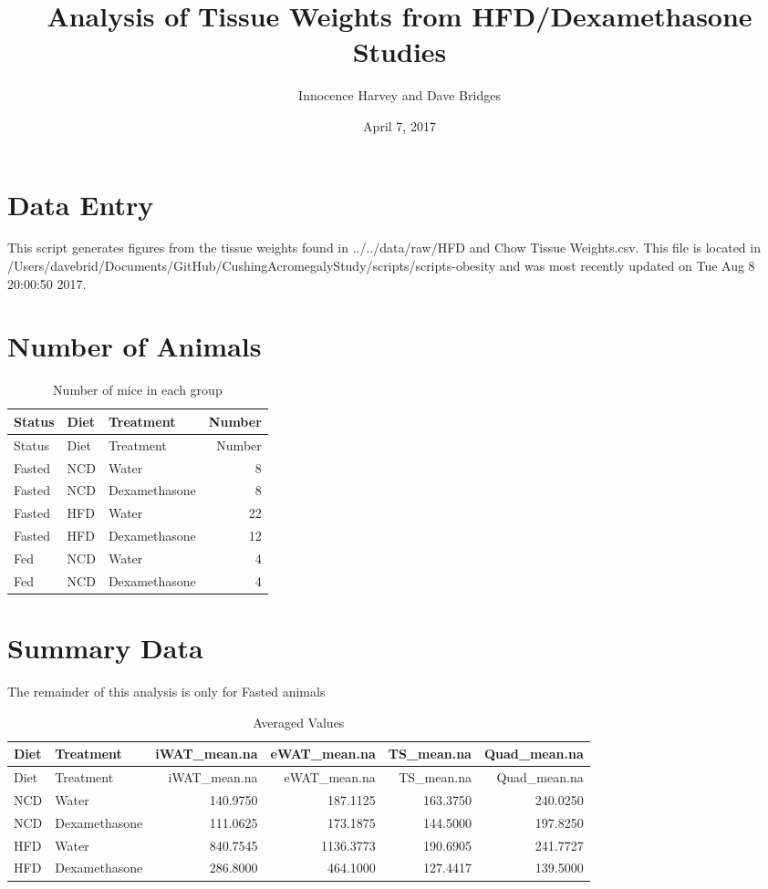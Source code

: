 \documentclass[]{article}
\title{Analysis of Tissue Weights from HFD/Dexamethasone Studies}
\author{Innocence Harvey and Dave Bridges}
\date{April 7, 2017}
\begin{document}
\maketitle

{
\setcounter{tocdepth}{2}
\tableofcontents
}
\section{Data Entry}\label{data-entry}

This script generates figures from the tissue weights found in
../../data/raw/HFD and Chow Tissue Weights.csv. This file is located in
/Users/davebrid/Documents/GitHub/CushingAcromegalyStudy/scripts/scripts-obesity
and was most recently updated on Tue Aug 8 20:00:50 2017.

\section{Number of Animals}\label{number-of-animals}

\begin{longtable}[]{@{}lllr@{}}
\caption{Number of mice in each group}\tabularnewline
\toprule
Status & Diet & Treatment & Number\tabularnewline
\midrule
\endfirsthead
\toprule
Status & Diet & Treatment & Number\tabularnewline
\midrule
\endhead
Fasted & NCD & Water & 8\tabularnewline
Fasted & NCD & Dexamethasone & 8\tabularnewline
Fasted & HFD & Water & 22\tabularnewline
Fasted & HFD & Dexamethasone & 12\tabularnewline
Fed & NCD & Water & 4\tabularnewline
Fed & NCD & Dexamethasone & 4\tabularnewline
\bottomrule
\end{longtable}

\section{Summary Data}\label{summary-data}

The remainder of this analysis is only for Fasted animals

\begin{longtable}[]{@{}llrrrr@{}}
\caption{Averaged Values}\tabularnewline
\toprule
Diet & Treatment & iWAT\_mean.na & eWAT\_mean.na & TS\_mean.na &
Quad\_mean.na\tabularnewline
\midrule
\endfirsthead
\toprule
Diet & Treatment & iWAT\_mean.na & eWAT\_mean.na & TS\_mean.na &
Quad\_mean.na\tabularnewline
\midrule
\endhead
NCD & Water & 140.9750 & 187.1125 & 163.3750 & 240.0250\tabularnewline
NCD & Dexamethasone & 111.0625 & 173.1875 & 144.5000 &
197.8250\tabularnewline
HFD & Water & 840.7545 & 1136.3773 & 190.6905 & 241.7727\tabularnewline
HFD & Dexamethasone & 286.8000 & 464.1000 & 127.4417 &
139.5000\tabularnewline
\bottomrule
\end{longtable}
\end{document}
